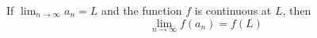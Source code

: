 \begin{frame}
\begin{theorem}
If $\lim_{n\to\infty} a_n = L$ and the function $f$ is continuous at $L$, then
\[
\lim_{n\to\infty} f(a_n) = f(L)
\]
\end{theorem}
\end{frame}
